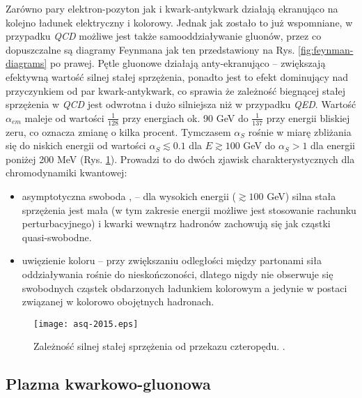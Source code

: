 Zarówno pary elektron-pozyton jak i kwark-antykwark działają ekranująco na kolejno ładunek elektryczny i kolorowy. Jednak jak zostało to już wspomniane, w przypadku \textit{QCD} możliwe jest także samooddziaływanie gluonów, przez co dopuszczalne są diagramy Feynmana jak ten przedstawiony na Rys. \ref{fig:feynman-diagrams} po prawej. Pętle gluonowe działają anty-ekranująco -- zwiększają efektywną wartość silnej stałej sprzężenia, ponadto jest to efekt dominujący nad przyczynkiem od par kwark-antykwark, co sprawia że zależność biegnącej stałej sprzężenia w \textit{QCD} jest odwrotna i dużo silniejsza niż w przypadku \textit{QED}. Wartość $\alpha_{em}$ maleje od wartości $\frac{1}{128}$ przy energiach ok. 90 GeV do $\frac{1}{137}$ przy energii bliskiej zeru, co oznacza zmianę o kilka procent. 
Tymczasem $\alpha_S$ rośnie w miarę zbliżania się do niskich energii od wartości $\alpha_S\lesssim 0.1$ dla $E \gtrsim 100$ GeV do $\alpha_S > 1$ dla energii poniżej 200 MeV (Rys. \ref{fig:running-coupling-const}). Prowadzi to do dwóch zjawisk charakterystycznych dla chromodynamiki kwantowej: 
\begin{itemize}
	\item asymptotyczna swoboda  \cite{Gross:1973id}, \cite{Politzer:1973fx} -- dla wysokich energii ($\gtrsim 100$ GeV) silna stała sprzężenia jest mała (w tym zakresie energii możliwe jest stosowanie rachunku perturbacyjnego) i kwarki wewnątrz hadronów zachowują się jak cząstki quasi-swobodne.
	\item uwięzienie koloru  -- przy zwiększaniu odległości między partonami siła oddziaływania rośnie do nieskończoności, dlatego nigdy nie obserwuje się swobodnych cząstek obdarzonych ładunkiem kolorowym a jedynie w postaci związanej w kolorowo obojętnych hadronach.
\end{itemize}


\begin{figure}[h]
	\centering
	\texttt{[image: asq-2015.eps]}
	\caption{Zależność silnej stałej sprzężenia od przekazu czteropędu. .}
	\label{fig:running-coupling-const}
\end{figure}


\subsection{Plazma kwarkowo-gluonowa}
\label{subsec:qgp}

